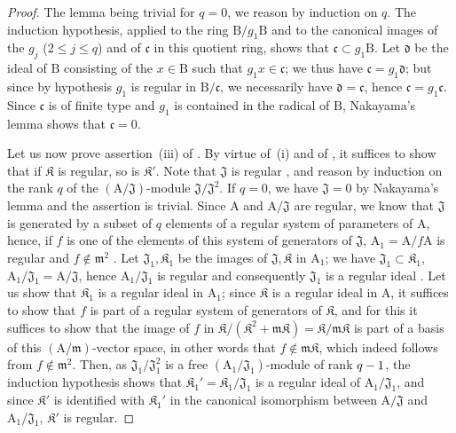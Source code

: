 \begin{proof}
The lemma being trivial for $q=0$, we reason by induction on $q$.
The induction hypothesis, applied to the ring $\mathrm{B}/g_1\mathrm{B}$ and to the canonical images of the $g_j$ ($2\leq j\leq q$)
and of $\mathfrak{c}$ in this quotient ring, shows that $\mathfrak{c}\subset g_1\mathrm{B}$.
Let $\mathfrak{d}$ be the ideal of $\mathrm{B}$ consisting of the $x\in\mathrm{B}$ such that $g_1x\in\mathfrak{c}$; we thus have $\mathfrak{c}=g_1\mathfrak{d}$; but since by hypothesis $g_1$ is regular in $\mathrm{B}/\mathfrak{c}$, we necessarily have $\mathfrak{d}=\mathfrak{c}$, hence $\mathfrak{c}=g_1\mathfrak{c}$.
Since $\mathfrak{c}$ is of finite type and $g_1$ is contained in the radical of $\mathrm{B}$, Nakayama's lemma shows that $\mathfrak{c}=0$.

Let us now prove assertion~(iii) of .
By virtue of~(i) and of , it suffices to show that if $\mathfrak K$ is regular, so is $\mathfrak K'$.
Note that $\mathfrak{J}$ is regular , and reason by induction on the rank $q$ of the $(\mathrm{A}/\mathfrak{J})$-module $\mathfrak{J}/\mathfrak{J}^2$.
If $q=0$, we have $\mathfrak{J}=0$ by Nakayama's lemma and the assertion is trivial.
Since $\mathrm{A}$ and $\mathrm{A}/\mathfrak{J}$ are regular, we know  that $\mathfrak{J}$ is generated by a subset of $q$ elements of a regular system of parameters of $\mathrm{A}$, hence, if $f$ is one of the elements of this system of generators of $\mathfrak{J}$, $\mathrm{A}_1=\mathrm{A}/f\mathrm{A}$ is regular and $f\notin\mathfrak{m}^2$ .
Let $\mathfrak{J}_1,\mathfrak K_1$ be the images of $\mathfrak{J},\mathfrak K$ in $\mathrm{A}_1$; we have $\mathfrak{J}_1\subset\mathfrak K_1$, $\mathrm{A}_1/\mathfrak{J}_1=\mathrm{A}/\mathfrak{J}$, hence $\mathrm{A}_1/\mathfrak{J}_1$ is regular and consequently $\mathfrak{J}_1$ is a regular ideal .
Let us show that $\mathfrak K_1$ is a regular ideal in $\mathrm{A}_1$; since $\mathfrak K$ is a regular ideal in $\mathrm{A}$, it suffices to show that $f$ is part of a regular system of generators of $\mathfrak K$, and for this  it suffices to show that the image of $f$ in $\mathfrak K/(\mathfrak K^2+\mathfrak{m}\mathfrak K)=\mathfrak K/\mathfrak{m}\mathfrak K$ is part of a basis of this $(\mathrm{A}/\mathfrak{m})$-vector space, in other words that $f\notin\mathfrak{m}\mathfrak K$, which indeed follows from $f\notin\mathfrak{m}^2$.
Then, as $\mathfrak{J}_1/\mathfrak{J}_1^2$ is a free $(\mathrm{A}_1/\mathfrak{J}_1)$-module of rank $q- 1$, the induction hypothesis shows that $\mathfrak K_1'=\mathfrak K_1/\mathfrak{J}_1$ is a regular ideal of $\mathrm{A}_1/\mathfrak{J}_1$, and since $\mathfrak K'$ is identified with $\mathfrak K_1'$ in the canonical isomorphism between $\mathrm{A}/\mathfrak{J}$ and $\mathrm{A}_1/\mathfrak{J}_1$, $\mathfrak K'$ is regular.
\end{proof}


